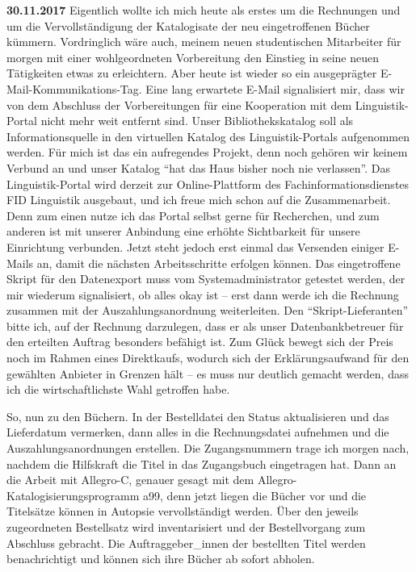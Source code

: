 \documentclass[a4paper,
fontsize=11pt,
oneside,
numbers=noperiodatend,
parskip=half-,
bibliography=totoc,
final
]{scrartcl}
\begin{document}
\textbf{30.11.2017} Eigentlich wollte ich mich heute als erstes um die
Rechnungen und um die Vervollständigung der Katalogisate der neu
eingetroffenen Bücher kümmern. Vordringlich wäre auch, meinem neuen
studentischen Mitarbeiter für morgen mit einer wohlgeordneten
Vorbereitung den Einstieg in seine neuen Tätigkeiten etwas zu
erleichtern. Aber heute ist wieder so ein ausgeprägter
E-Mail-Kommunikations-Tag. Eine lang erwartete E-Mail signalisiert mir,
dass wir von dem Abschluss der Vorbereitungen für eine Kooperation mit
dem Linguistik-Portal nicht mehr weit entfernt sind. Unser
Bibliothekskatalog soll als Informationsquelle in den virtuellen Katalog
des Linguistik-Portals aufgenommen werden. Für mich ist das ein
aufregendes Projekt, denn noch gehören wir keinem Verbund an und unser
Katalog \enquote{hat das Haus bisher noch nie verlassen}. Das
Linguistik-Portal wird derzeit zur Online-Plattform des
Fachinformationsdienstes FID Linguistik ausgebaut, und ich freue mich
schon auf die Zusammenarbeit. Denn zum einen nutze ich das Portal selbst
gerne für Recherchen, und zum anderen ist mit unserer Anbindung eine
erhöhte Sichtbarkeit für unsere Einrichtung verbunden. Jetzt steht
jedoch erst einmal das Versenden einiger E-Mails an, damit die nächsten
Arbeitsschritte erfolgen können. Das eingetroffene Skript für den
Datenexport muss vom Systemadministrator getestet werden, der mir
wiederum signalisiert, ob alles okay ist -- erst dann werde ich die
Rechnung zusammen mit der Auszahlungsanordnung weiterleiten. Den
\enquote{Skript-Lieferanten} bitte ich, auf der Rechnung darzulegen,
dass er als unser Datenbankbetreuer für den erteilten Auftrag besonders
befähigt ist. Zum Glück bewegt sich der Preis noch im Rahmen eines
Direktkaufs, wodurch sich der Erklärungsaufwand für den gewählten
Anbieter in Grenzen hält -- es muss nur deutlich gemacht werden, dass
ich die wirtschaftlichste Wahl getroffen habe.

So, nun zu den Büchern. In der Bestelldatei den Status aktualisieren und
das Lieferdatum vermerken, dann alles in die Rechnungsdatei aufnehmen
und die Auszahlungsanordnungen erstellen. Die Zugangsnummern trage ich
morgen nach, nachdem die Hilfskraft die Titel in das Zugangsbuch
eingetragen hat. Dann an die Arbeit mit Allegro-C, genauer gesagt mit
dem Allegro-Katalogisierungsprogramm a99, denn jetzt liegen die Bücher
vor und die Titelsätze können in Autopsie vervollständigt werden. Über
den jeweils zugeordneten Bestellsatz wird inventarisiert und der
Bestellvorgang zum Abschluss gebracht. Die Auftraggeber\_innen der
bestellten Titel werden benachrichtigt und können sich ihre Bücher ab
sofort abholen.
\end{document}

